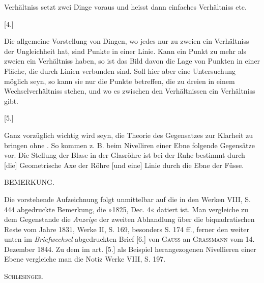 Verhältniss setzt zwei Dinge voraus und heisst dann einfaches Verhältniss etc.
\begin{center}[4.]\end{center}
\noindent\hspace*{\parindent}Die allgemeine Vorstellung von Dingen, wo jedes nur zu zweien ein Verhältniss der Ungleichheit hat, sind Punkte in einer Linie.
\clearpage{}
\noindent\hspace*{\parindent}Kann ein Punkt zu mehr als zweien ein Verhältniss haben, so ist das Bild davon die Lage von Punkten in einer Fläche, die durch Linien verbunden sind. Soll hier aber eine Untersuchung möglich seyn, so kann sie nur die Punkte betreffen, die zu dreien in einem Wechselverhältniss stehen, und wo es zwischen den Verhältnissen ein Verhältniss gibt.
\begin{center}[5.]\end{center}
\noindent\hspace*{\parindent}Ganz vorzüglich wichtig wird seyn, die Theorie des Gegensatzes zur Klarheit zu bringen ohne . So kommen z. B. beim Nivelliren einer Ebne folgende Gegensätze vor. Die Stellung der Blase in der Glasröhre ist bei der Ruhe bestimmt durch [die] Geometrische Axe der Röhre [und eine] Linie durch die Ebne der Füsse.
\begin{center}BEMERKUNG.\end{center}
{\small\noindent\hspace*{\parindent}Die vorstehende Aufzeichnung folgt unmittelbar auf die in den Werken VIII, S. 444 abgedruckte Bemerkung, die »1825, Dec. 4« datiert ist. Man vergleiche zu dem Gegenstande die \textit{Anzeige} der zweiten Abhandlung über die biquadratischen Reste vom Jahre 1831, Werke II, S. 169, besonders S. 174 ff., ferner den weiter unten im \textit{Briefwechsel} abgedruckten Brief [6.] von \textsc{Gauss} an \textsc{Grassmann} vom 14. Dezember 1844. Zu dem im art. [5.] als Beispiel herangezogenen Nivellieren einer Ebene vergleiche man die Notiz Werke VIII, S. 197.\par}
\begin{flushright}\textsc{Schlesinger}.\end{flushright}
\ClosingRule
